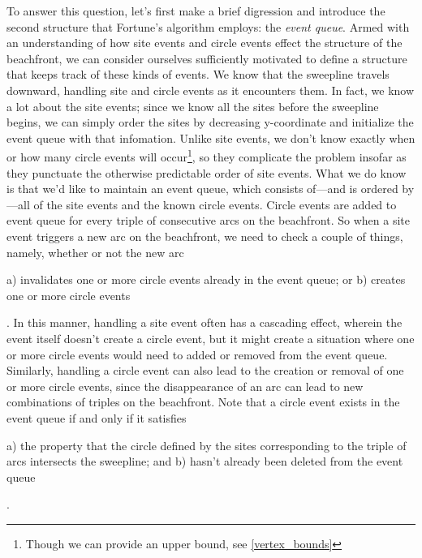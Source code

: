 \documentclass[12pt,twoside]{reedthesis}
\begin{document}
    To answer this question, let's first make a brief digression and introduce the second structure that Fortune's algorithm employs: the \emph{event queue}. Armed with an understanding of how site events and circle events effect the structure of the beachfront, we can consider ourselves sufficiently motivated to define a structure that keeps track of these kinds of events. We know that the sweepline travels downward, handling site and circle events as it encounters them. In fact, we know a lot about the site events; since we know all the sites before the sweepline begins, we can simply order the sites by decreasing y-coordinate and initialize the event queue with that infomation. Unlike site events, we don't know exactly when or how many circle events will occur\footnote{Though we can provide an upper bound, see \cref{vertex_bounds}}, so they complicate the problem insofar as they punctuate the otherwise predictable order of site events. What we do know is that we'd like to maintain an event queue, which consists of---and is ordered by---all of the site events and the known circle events.  Circle events are added to event queue for every triple of consecutive arcs on the beachfront. So when a site event triggers a new arc on the beachfront, we need to check a couple of things, namely, whether or not the new arc\begin{inparaenum}
    a) invalidates one or more circle events already in the event queue; or
    b) creates one or more circle events\end{inparaenum}. In this manner, handling a site event often has a cascading effect, wherein the event itself doesn't create a circle event, but it might create a situation where one or more circle events would need to added or removed from the event queue. Similarly, handling a circle event can also lead to the creation or removal of one or more circle events, since the disappearance of an arc can lead to new combinations of triples on the beachfront. Note that a circle event exists in the event queue if and only if it satisfies\begin{inparaenum}
    a) the property that the circle defined by the sites corresponding to the triple of arcs intersects the sweepline; and
    b) hasn't already been deleted from the event queue\end{inparaenum}.
\end{document}
